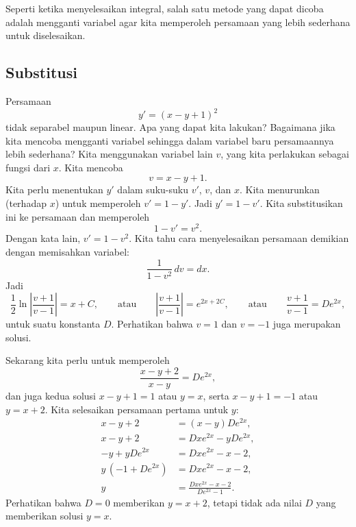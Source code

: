 

Seperti ketika menyelesaikan integral, salah satu metode yang dapat dicoba adalah mengganti variabel agar
kita memperoleh persamaan yang lebih sederhana untuk diselesaikan.

\subsection{Substitusi}

Persamaan
\begin{equation*}
y' = {(x-y+1)}^2
\end{equation*}
tidak separabel maupun linear. Apa yang dapat kita lakukan?
Bagaimana jika kita mencoba mengganti variabel sehingga dalam variabel baru
persamaannya lebih sederhana? Kita menggunakan variabel lain $v$, yang kita perlakukan sebagai
fungsi dari $x$. Kita mencoba
\begin{equation*}
v = x-y+1 .
\end{equation*}
Kita perlu menentukan
$y'$ dalam suku-suku $v'$, $v$, dan $x$. Kita menurunkan (terhadap $x$) untuk
memperoleh $v' = 1 - y'$. Jadi $y' = 1-v'$. Kita substitusikan ini ke persamaan dan memperoleh
\begin{equation*}
1-v' = v^2 .
\end{equation*}
Dengan kata lain, $v' = 1-v^2$. Kita tahu cara menyelesaikan persamaan demikian dengan
memisahkan variabel:
\begin{equation*}
\frac{1}{1-v^2} \,dv = dx .
\end{equation*}
Jadi
\begin{equation*}
\frac{1}{2} \ln \left\lvert  \frac{v+1}{v-1} \right\rvert = x + C ,
\qquad \text{atau} \qquad
\left\lvert \frac{v+1}{v-1} \right\rvert = e^{2x + 2C} ,
\qquad \text{atau} \qquad
\frac{v+1}{v-1} = D e^{2x} ,
\end{equation*}
untuk suatu konstanta $D$.
Perhatikan bahwa $v=1$ dan $v=-1$ juga merupakan solusi.

Sekarang kita perlu  untuk memperoleh
\begin{equation*}
\frac{x-y+2}{x-y} = D e^{2x} ,
\end{equation*}
dan juga kedua solusi $x-y+1=1$ atau $y=x$, serta $x-y+1=-1$ atau $y=x+2$.
Kita selesaikan persamaan pertama untuk $y$:
\begin{equation*}
\begin{aligned}
x-y+2 &= (x-y)D e^{2x} , \\
x-y+2 &= Dx e^{2x}-yD e^{2x} , \\
-y + yD e^{2x} &= Dx e^{2x} - x - 2 , \\
y\,(-1+ D e^{2x}) &= Dx e^{2x} - x - 2 , \\
y  &= \frac{Dx e^{2x} - x - 2}{D e^{2x}-1} .
\end{aligned}
\end{equation*}
Perhatikan bahwa $D=0$ memberikan $y=x+2$, tetapi tidak ada nilai $D$ yang memberikan solusi $y=x$.

